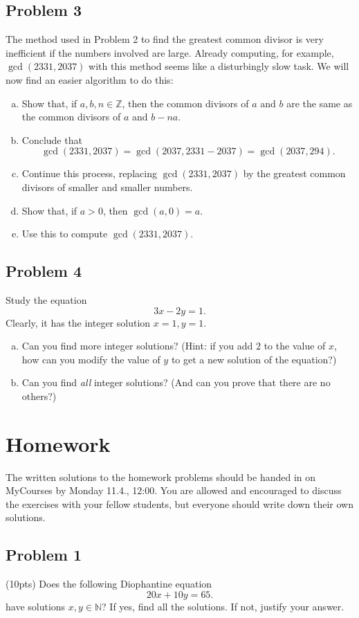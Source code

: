 \documentclass{amsart}
\newcommand{\Z}{\mathbb{Z}}
\newcommand{\N}{\mathbb{N}}
\theoremstyle{definition} \newtheorem*{definition}{Definition}
\theoremstyle{remark} \newtheorem*{ex}{Example}
\begin{document}
 \subsection*{Problem 3}
The method used in Problem 2 to find the greatest common divisor is very inefficient if the numbers involved are large. Already computing, for example, $\gcd(2331, 2037)$ with this method seems like a disturbingly slow task. We will now find an easier algorithm to do this:
\begin{enumerate}[a)]
\item Show that, if $a,b,n\in \Z$, then the common divisors of $a$ and $b$ are the same as the common divisors of $a$ and $b-na$.
\item Conclude that $$\gcd(2331, 2037)=\gcd(2037, 2331-2037)=\gcd(2037, 294).$$
\item Continue this process, replacing $\gcd(2331, 2037)$ by the greatest common divisors of smaller and smaller numbers.
\item Show that, if $a> 0$, then $\gcd(a,0)=a$.
\item Use this to compute $\gcd(2331, 2037)$.
\end{enumerate}

 \subsection*{Problem 4}
Study the equation $$3x-2y=1.$$ Clearly, it has the integer solution $x=1, y=1$. 
\begin{enumerate}[a)]
\item Can you find more integer solutions? (Hint: if you add  $2$ to the value of $x$, how can you modify  the value of $y$ to get a new solution of the equation?)
\item Can you find {\em all} integer solutions? (And can you prove that there are no others?)
\end{enumerate}
\pagebreak

 \section*{Homework}
The written solutions to the homework problems should be handed in on MyCourses by Monday 11.4., 12:00.  You are allowed and encouraged to discuss the exercises with your fellow students, but everyone should write down their own solutions.

\subsection*{Problem 1}
(10pts) Does the following Diophantine equation 
$$20x + 10y = 65.$$
have solutions $x,y \in \N$? If yes, find all the solutions. If not, justify your answer.
\end{document}
